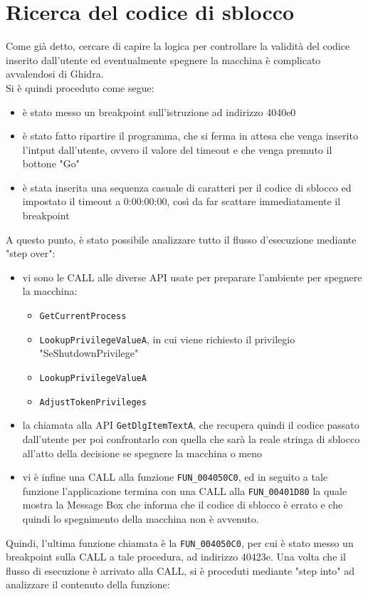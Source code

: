 \documentclass{article}
\begin{document}
\section{Ricerca del codice di sblocco}
Come già detto, cercare di capire la logica per controllare la validità del codice inserito dall'utente ed eventualmente spegnere la macchina è complicato avvalendosi di Ghidra.\\Si è quindi proceduto come segue:
\begin{itemize}
\item è stato messo un breakpoint sull'istruzione ad indirizzo 4040e0
\item è stato fatto ripartire il programma, che si ferma in attesa che venga inserito l'intput dall'utente, ovvero il valore del timeout e che venga premuto il bottone "Go"
\item è stata inserita una sequenza casuale di caratteri per il codice di sblocco ed impostato il timeout a 0:00:00:00, così da far scattare immediatamente il breakpoint
\end{itemize}
A questo punto, è stato possibile analizzare tutto il flusso d'esecuzione mediante "step over":
\begin{itemize}
\item vi sono le CALL alle diverse API usate per preparare l'ambiente per spegnere la macchina:
\begin{itemize}
\item \texttt{GetCurrentProcess}
\item \texttt{LookupPrivilegeValueA}, in cui viene richiesto il privilegio "SeShutdownPrivilege"
\item \texttt{LookupPrivilegeValueA}
\item \texttt{AdjustTokenPrivileges}
\end{itemize}
\item la chiamata alla API \texttt{GetDlgItemTextA}, che recupera quindi il codice passato dall'utente per poi confrontarlo con quella che sarà la reale stringa di sblocco all'atto della decisione se spegnere la macchina o meno
\item vi è infine una CALL alla funzione \texttt{FUN\_004050C0}, ed in seguito a tale funzione l'applicazione termina con una CALL alla \texttt{FUN\_00401D80} la quale mostra la Message Box che informa che il codice di sblocco è errato e che quindi lo spegnimento della macchina non è avvenuto.
\end{itemize}
Quindi, l'ultima funzione chiamata è la \texttt{FUN\_004050C0}, per cui è stato messo un breakpoint sulla CALL a tale procedura, ad indirizzo 40423e. Una volta che il flusso di esecuzione è arrivato alla CALL, si è proceduti mediante "step into" ad analizzare il contenuto della funzione:
\end{document}
